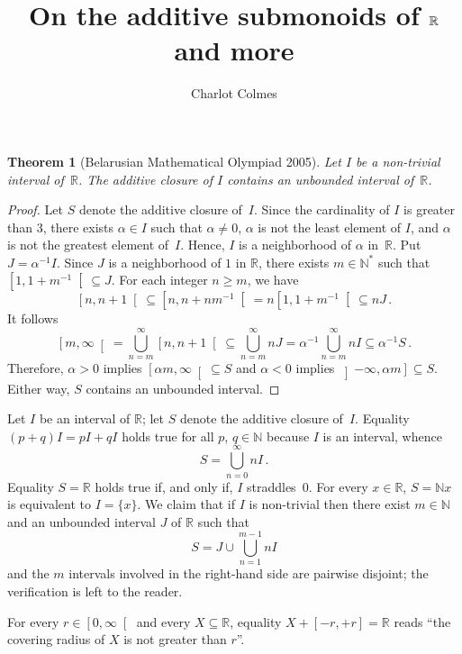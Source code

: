 \documentclass[12pt]{article}
\title{On the additive submonoids of $\bR$ and more}
\author{Charlot Colmes}
\newcommand{\bZ}{\mathbb{Z}}
\newcommand{\bN}{\mathbb{N}} %
\newcommand{\bNast}{\bN^*} %
\newcommand{\bR}{\mathbb{R}}
\newcommand{\Rnneg}{\left[0, \infty\right[} %
\newtheorem{theorem}{Theorem}
\theoremstyle{definition}
\begin{document}
\maketitle

\sloppy


 \begin{theorem}[Belarusian Mathematical Olympiad 2005]
   Let $I$ be a non-trivial interval of~$\bR$.
   The additive closure of $I$ contains an unbounded interval of~$\bR$.
\end{theorem}

\begin{proof}
  Let $S$ denote the additive closure of~$I$.
  Since the cardinality of $I$ is greater than $3$,
  there exists $\alpha \in I$ such that $\alpha \ne 0$,
  $\alpha$ is not the least element of $I$, and
  $\alpha$ is not the greatest element of~$I$.
  Hence, $I$ is a neighborhood of $\alpha$ in~$\bR$.
  Put $J = \alpha^{-1} I$.
  Since $J$ is a neighborhood of $1$ in $\bR$, 
  there exists $m \in \bNast$ such that $\left[1, 1 + m^{-1} \right[ \subseteq J$.
  For each integer $n \ge m$,
  we have 
  $$
  \left[n, n + 1 \right[
  \subseteq
  \left[n, n + n m^{-1} \right[
  =
  n \left[1, 1 + m^{-1} \right[
  \subseteq
  n J \, . 
  $$
  It follows
  $$
  \left[m, \infty \right[
   = \bigcup_{n = m}^\infty \left[n, n + 1 \right[
   \subseteq \bigcup_{n = m}^\infty  n J
   = \alpha^{-1} \bigcup_{n = m}^\infty n  I
   \subseteq \alpha^{-1}  S \, .
   $$
   Therefore,
   $\alpha > 0$ implies $\left[\alpha m, \infty \right[ \subseteq S$
   and $\alpha < 0$ implies $\left] - \infty, \alpha m \right] \subseteq S$.
   Either way, $S$ contains an unbounded interval.
 \end{proof}

 Let $I$ be an interval of $\bR$;
 let $S$ denote the additive closure of~$I$.
 Equality $(p + q) I = p I + q I$ holds true for all $p$, $q \in \bN$ because $I$ is an interval, whence 
  $$
  S = \bigcup_{n = 0}^\infty n I \,.
  $$
 Equality $S = \bR$ holds true if, and only if, $I$ straddles~$0$.
 For every $x \in \bR$, $S = \bN x$ is equivalent to $I = \{ x \}$.
 We claim that if $I$ is non-trivial then there exist $m \in \bN$ and an unbounded interval $J$ of $\bR$ such that
 $$
 S = J \cup \bigcup_{n = 1}^{m - 1} n I  
 $$
 and the $m$ intervals involved in the right-hand side are pairwise disjoint;
 the verification is left to the reader.



 For every $r \in \Rnneg$ and every $X \subseteq \bR$,
 equality $X + [- r, + r ] = \bR$ reads ``the covering radius of $X$ is not greater than $r$''.
\end{document}
